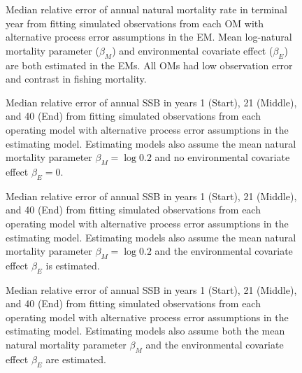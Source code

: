 \documentclass[
  12pt,
]{article}
\begin{document}
\begin{landscape}
\begin{figure}
\caption{Median relative error of annual natural mortality rate in terminal year from fitting simulated observations from each OM with alternative process error assumptions in the EM. Mean log-natural mortality parameter ($\beta_M$) and environmental covariate effect ($\beta_E$) are both estimated in the EMs. All OMs had low observation error and contrast in fishing mortality.}\label{terminal_M_bias}
\begin{center}
\end{center}
\end{figure}
\end{landscape}

\begin{landscape}
\begin{figure}
\caption{Median relative error of annual SSB in years 1 (Start), 21 (Middle), and 40 (End) from fitting simulated observations from each operating model with alternative process error assumptions in the estimating model. Estimating models also assume the mean natural mortality parameter $\beta_M = \log 0.2$ and no environmental covariate effect $\beta_E = 0$.}\label{SSB_bias_M_fixed_beta_fixed}
\begin{center}
\end{center}
\end{figure}
\end{landscape}

\begin{landscape}
\begin{figure}
\caption{Median relative error of annual SSB in years 1 (Start), 21 (Middle), and 40 (End) from fitting simulated observations from each operating model with alternative process error assumptions in the estimating model. Estimating models also assume the mean natural mortality parameter $\beta_M = \log 0.2$ and the environmental covariate effect $\beta_E$ is estimated.}\label{SSB_bias_M_fixed_beta_estimated}
\begin{center}
\end{center}
\end{figure}
\end{landscape}

\begin{landscape}
\begin{figure}
\caption{Median relative error of annual SSB in years 1 (Start), 21 (Middle), and 40 (End) from fitting simulated observations from each operating model with alternative process error assumptions in the estimating model. Estimating models also assume both the mean natural mortality parameter $\beta_M$ and the environmental covariate effect $\beta_E$ are estimated.}\label{SSB_bias_M_estimated_beta_estimated}
\begin{center}
\end{center}
\end{figure}
\end{landscape}
\end{document}
